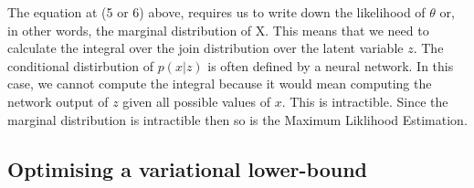 \documentclass[11pt]{article}
\begin{document}
\begin{figure}[H]
    \centering
\end{figure}

The equation at (5 or 6) above, requires us to write down the likelihood of $\theta$ or, in other words, the marginal distribution of X. This means that we need to calculate the integral over the join distribution over the latent variable $z$. The conditional distirbution of $p(x|z)$ is often defined by a neural network. In this case, we cannot compute the integral because it would mean computing the network output of $z$ given all possible values of $x$. This is intractible. Since the marginal distribution is intractible then so is the Maximum Liklihood Estimation.

\subsection{Optimising a variational lower-bound}\label{sect:Optimising a variational lower-bound}
\end{document}
